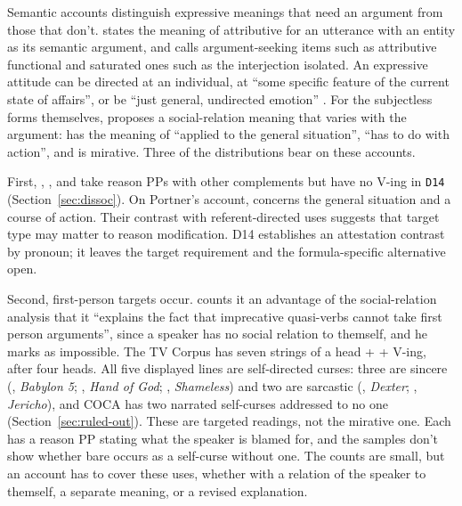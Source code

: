 \documentclass[12pt]{article}
\begin{document}
Semantic accounts distinguish expressive meanings that need an argument from those that don't. \textcite[175]{potts2007} states the meaning of attributive  for an utterance with an entity as its semantic argument, and \textcite[6, 27]{gutzmann2013} calls argument-seeking items such as attributive  functional and saturated ones such as the interjection  isolated. An expressive attitude can be directed at an individual, at \enquote{some specific feature of the current state of affairs}, or be \enquote{just general, undirected emotion} \citep[173]{potts2007}. For the subjectless forms themselves, \textcite[10--11]{portner2026} proposes a social-relation meaning that varies with the argument:  has the meaning of  \enquote{applied to the general situation},  \enquote{has to do with action}, and  is mirative. Three of the distributions bear on these accounts.

First, , ,  and  take reason PPs with other complements but have no  V-ing in \texttt{D14} (Section~\ref{sec:dissoc}). On Portner's account,  concerns the general situation and  a course of action. Their contrast with referent-directed uses suggests that target type may matter to reason modification. D14 establishes an attestation contrast by pronoun; it leaves the target requirement and the formula-specific alternative open.

Second, first-person targets occur. \textcite[15]{portner2026} counts it an advantage of the social-relation analysis that it \enquote{explains the fact that imprecative quasi-verbs cannot take first person arguments}, since a speaker has no social relation to themself, and he marks  as impossible. The TV Corpus has seven strings of a head +  +  V-ing, after four heads. All five displayed lines are self-directed curses: three are sincere (, \emph{Babylon 5}; , \emph{Hand of God}; , \emph{Shameless}) and two are sarcastic (, \emph{Dexter}; , \emph{Jericho}), and COCA has two narrated self-curses addressed to no one (Section~\ref{sec:ruled-out}). These are targeted readings, not the mirative one. Each has a reason PP stating what the speaker is blamed for, and the samples don't show whether bare  occurs as a self-curse without one. The counts are small, but an account has to cover these uses, whether with a relation of the speaker to themself, a separate meaning, or a revised explanation.
\end{document}
